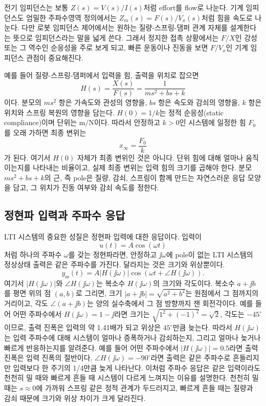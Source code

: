 전기 임피던스는 보통 $Z(s)=V(s)/I(s)$처럼 effort를 flow로 나눈다.
기계 임피던스도 엄밀한 주파수영역 정의에서는 $Z_m(s)=F(s)/V_x(s)$처럼 힘을 속도로 나눈다.
다만 로봇 임피던스 제어에서는 원하는 질량-스프링-댐퍼 관계 자체를 설계한다는 뜻으로 임피던스라는 말을 넓게 쓴다.
그래서 정지한 접촉 상황에서는 $F/X$인 강성 또는 그 역수인 순응성을 주로 보게 되고, 빠른 운동이나 진동을 보면 $F/V_x$인 기계 임피던스 관점이 중요해진다.

예를 들어 질량-스프링-댐퍼에서 입력을 힘, 출력을 위치로 잡으면
\begin{equation}
  H(s)=\frac{X(s)}{F(s)}
  =
  \frac{1}{ms^2+bs+k}
\end{equation}
이다.
분모의 $ms^2$ 항은 가속도와 관성의 영향을, $bs$ 항은 속도와 감쇠의 영향을, $k$ 항은 위치와 스프링 복원의 영향을 담는다.
$H(0)=1/k$는 정적 순응성(static compliance)이며 단위는 $\mathrm{m/N}$이다.
따라서 안정하고 $k>0$인 시스템에 일정한 힘 $F_0$를 오래 가하면 최종 변위는
\begin{equation}
  x_\infty = \frac{F_0}{k}
\end{equation}
가 된다.
여기서 $H(0)$ 자체가 최종 변위인 것은 아니다.
단위 힘에 대해 얼마나 움직이는지를 나타내는 비율이고, 실제 최종 변위는 입력 힘의 크기를 곱해야 한다.
분모 $ms^2+bs+k$의 근, 즉 pole은 질량, 감쇠, 스프링이 함께 만드는 자연스러운 응답 모양을 담고, 그 위치가 진동 여부와 감쇠 속도를 정한다.

\subsection{정현파 입력과 주파수 응답}

LTI 시스템의 중요한 성질은 정현파 입력에 대한 응답이다.
입력이
\begin{equation}
  u(t) = A\cos(\omega t)
\end{equation}
처럼 하나의 주파수 $\omega$를 갖는 정현파라면, 안정하고 $\jj\omega$에 pole이 없는 LTI 시스템의 정상상태 출력은 같은 주파수를 가진다.
달라지는 것은 크기와 위상뿐이다.
\begin{equation}
  y_{\mathrm{ss}}(t)
  =
  A|H(\jj\omega)|
  \cos\left(\omega t + \angle H(\jj\omega)\right).
\end{equation}
여기서 $|H(\jj\omega)|$와 $\angle H(\jj\omega)$는 복소수 $H(\jj\omega)$의 크기와 각도이다.
복소수 $a+\jj b$를 평면 위의 점 $(a,b)$로 그리면, 크기 $|a+\jj b|=\sqrt{a^2+b^2}$는 원점에서 그 점까지의 거리이고, 각도 $\angle(a+\jj b)$는 양의 실수축에서 그 점 방향까지 잰 회전각이다.
예를 들어 어떤 주파수에서 $H(\jj\omega)=1-\jj$라면 크기는 $\sqrt{1^2+(-1)^2}=\sqrt{2}$, 각도는 $-45^\circ$이므로, 출력 진폭은 입력의 약 1.41배가 되고 위상은 $45^\circ$만큼 늦는다.
%
따라서 $H(\jj\omega)$는 입력 주파수에 대해 시스템이 얼마나 증폭하거나 감쇠하는지, 그리고 얼마나 늦거나 빠르게 반응하는지를 알려준다.
예를 들어 어떤 주파수에서 $|H(\jj\omega)|=0.5$라면 출력 진폭은 입력 진폭의 절반이다.
$\angle H(\jj\omega)=-90^\circ$라면 출력은 같은 주파수로 흔들리지만 입력보다 한 주기의 1/4만큼 늦게 나타난다.
이처럼 주파수 응답은 같은 입력이라도 천천히 밀 때와 빠르게 흔들 때 시스템이 다르게 느껴지는 이유를 설명한다.
천천히 밀 때는 $s\approx0$에 가까워 스프링 같은 정적 관계가 두드러지고, 빠르게 흔들 때는 질량과 감쇠 때문에 크기와 위상 차이가 크게 달라진다.


